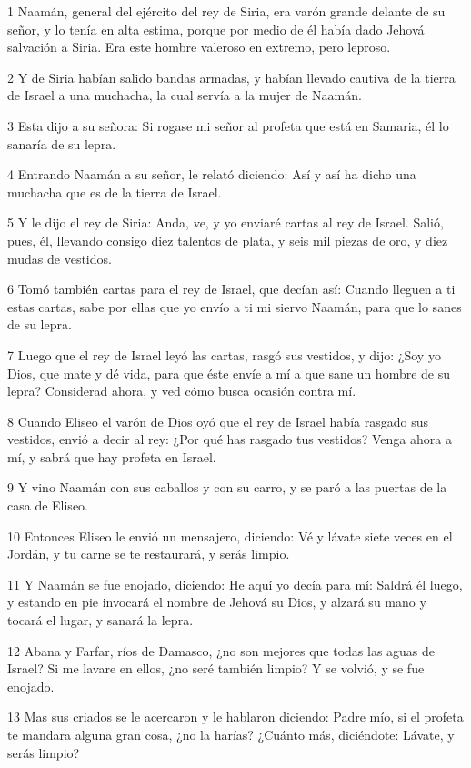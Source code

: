 \par 1 Naamán, general del ejército del rey de Siria, era varón grande delante de su señor, y lo tenía en alta estima, porque por medio de él había dado Jehová salvación a Siria. Era este hombre valeroso en extremo, pero leproso.
\par 2 Y de Siria habían salido bandas armadas, y habían llevado cautiva de la tierra de Israel a una muchacha, la cual servía a la mujer de Naamán.
\par 3 Esta dijo a su señora: Si rogase mi señor al profeta que está en Samaria, él lo sanaría de su lepra.
\par 4 Entrando Naamán a su señor, le relató diciendo: Así y así ha dicho una muchacha que es de la tierra de Israel.
\par 5 Y le dijo el rey de Siria: Anda, ve, y yo enviaré cartas al rey de Israel. Salió, pues, él, llevando consigo diez talentos de plata,   y seis mil piezas de oro, y diez mudas de vestidos.
\par 6 Tomó también cartas para el rey de Israel, que decían así: Cuando lleguen a ti estas cartas, sabe por ellas que yo envío a ti mi siervo Naamán, para que lo sanes de su lepra.
\par 7 Luego que el rey de Israel leyó las cartas, rasgó sus vestidos, y dijo: ¿Soy yo Dios, que mate y dé vida, para que éste envíe a mí a que sane un hombre de su lepra? Considerad ahora, y ved cómo busca ocasión contra mí.
\par 8 Cuando Eliseo el varón de Dios oyó que el rey de Israel había rasgado sus vestidos, envió a decir al rey: ¿Por qué has rasgado tus vestidos? Venga ahora a mí, y sabrá que hay profeta en Israel.
\par 9 Y vino Naamán con sus caballos y con su carro, y se paró a las puertas de la casa de Eliseo.
\par 10 Entonces Eliseo le envió un mensajero, diciendo: Vé y lávate siete veces en el Jordán, y tu carne se te restaurará, y serás limpio.
\par 11 Y Naamán se fue enojado, diciendo: He aquí yo decía para mí: Saldrá él luego, y estando en pie invocará el nombre de Jehová su Dios, y alzará su mano y tocará el lugar, y sanará la lepra.
\par 12 Abana y Farfar, ríos de Damasco, ¿no son mejores que todas las aguas de Israel? Si me lavare en ellos, ¿no seré también limpio? Y se volvió, y se fue enojado.
\par 13 Mas sus criados se le acercaron y le hablaron diciendo: Padre mío, si el profeta te mandara alguna gran cosa, ¿no la harías? ¿Cuánto más, diciéndote: Lávate, y serás limpio?
